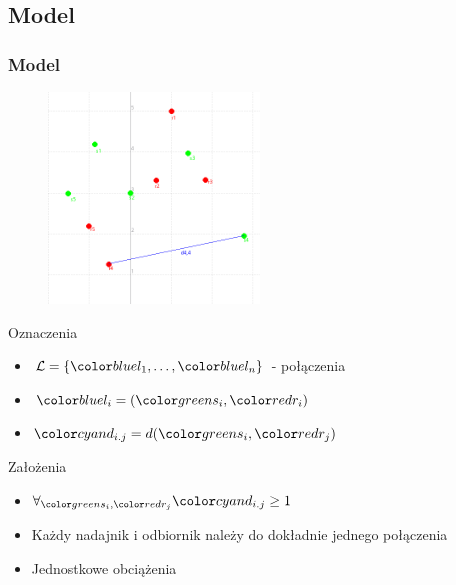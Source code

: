 \documentclass[polish, t,10pt]{beamer}
\begin{document}
\subsection{Model}
    \begin{frame}
        \frametitle{Model}
        \begin{figure}
            \includegraphics[width=0.5\textwidth]{pictures/model-variables.png}
        \end{figure}
        Oznaczenia
        \begin{itemize}
            \item $\mathcal{L} = \{\lo, \ldots, \ln\}$ - połączenia
            \item $\li = (\si, \ri)$
            \item $\dij = d(\si, \rj)$
        \end{itemize}
        Założenia
        \begin{itemize}
            \item $\forall_{\si, \rj} \dij \geq 1$
            \item Każdy nadajnik i odbiornik należy do dokładnie jednego połączenia
            \item Jednostkowe obciążenia
        \end{itemize}
    \end{frame}
\end{document}
